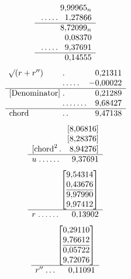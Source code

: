 \[
\begin{array}{l@{\;}l@{\;}r}
&&9{,}99965_n\\
&\mathord{.}\,\mathord{.}\,\mathord{.}\,\mathord{.}\,\mathord{.}&1{,}27866\\\hline
&&8{,}72099_n\\
&&0{,}08370\\
&\mathord{.}\,\mathord{.}\,\mathord{.}\,\mathord{.}\,\mathord{.}&9{,}37691\\\hline
&&0{,}14555
\end{array}
\]
\[
\begin{array}{l@{\;}l@{\;}r}
\BareRoot{(r+r'')}&\mathord{.}&0{,}21311\\
&\mathord{.}\,\mathord{.}\,\mathord{.}\,\mathord{.}\,\mathord{.}&-0{,}00022\\\hline
[\text{Denominator}]&\mathord{.}&0{,}21289\\
&\mathord{.}\,\mathord{.}\,\mathord{.}\,\mathord{.}\,\mathord{.}\,\mathord{.}\,\mathord{.}&9{,}68427\\\hline
\text{chord}&\mathord{.}\,\mathord{.}&9{,}47138
\end{array}
\]
\[
\begin{array}{l@{\;}l@{\;}r}
&&[8{,}06816]\\
&&[8{,}28376]\\
\multicolumn{3}{r}{[\text{chord}^2\,\mathord{.}\quad8{,}94276]}\\\hline
u&\mathord{.}\,\mathord{.}\,\mathord{.}\,\mathord{.}\,\mathord{.}\,\mathord{.}&9{,}37691
\end{array}
\]
\[
\begin{array}{l@{\;}l@{\;}r}
&&\left[\begin{array}{@{}r@{}}9{,}54314\\0{,}43676\\\hline9{,}97990\\9{,}97412\end{array}\right]\\\hline
r&\mathord{.}\,\mathord{.}\,\mathord{.}\,\mathord{.}\,\mathord{.}\,\mathord{.}&0{,}13902
\end{array}
\]
\[
\begin{array}{l@{\;}l@{\;}r}
&&\left[\begin{array}{@{}r@{}}0{,}29110\\9{,}76612\\\hline0{,}05722\\9{,}72076\end{array}\right]\\\hline
r''&\mathord{.}\,\mathord{.}\,\mathord{.}&0{,}11091
\end{array}
\]
